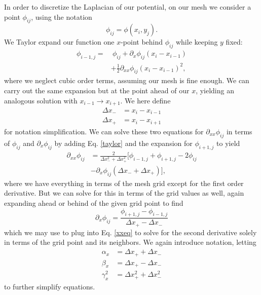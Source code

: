 \documentclass[reprint, amsmath, amssymb, aps, floatfix]{revtex4-1}
\begin{document}
In order to discretize the Laplacian of our potential, on our mesh we consider a point $\phi_{ij}$, using the notation $$\phi_{ij}=\phi(x_i,y_j).$$ We Taylor expand our function one $x$-point behind $\phi_{ij}$ while keeping $y$ fixed: \begin{equation}
\begin{aligned}
\phi_{i-1,j} =&\ \phi_{ij} + \partial_x \phi_{ij}(x_i-x_{i-1})\\&+\frac{1}{2}\partial_{xx}\phi_{ij}(x_i-x_{i-1})^2, \label{taylor}
\end{aligned}
\end{equation} where we neglect cubic order terms, assuming our mesh is fine enough. We can carry out the same expansion but at the point ahead of our $x$, yielding an analogous solution with $x_{i-1}\to x_{i+1}$. We here define \begin{equation}
\begin{aligned}
\Delta x_- &= x_i-x_{i-1}\\
\Delta x_+ &= x_i-x_{i+1} \label{deltaeq}
\end{aligned}
\end{equation} for notation simplification. We can solve these two equations for $\partial_{xx}\phi_{ij}$ in terms of $\phi_{ij}$ and $\partial_x\phi_{ij}$ by adding Eq. \eqref{taylor} and the expansion for $\phi_{i+1,j}$ to yield \begin{equation}
\begin{aligned}
\partial_{xx}\phi_{ij} &= \frac{2}{\Delta x_-^2+\Delta x_+^2}\biggl[\phi_{i-1,j}+\phi_{i+1,j}-2\phi_{ij}\\&-\partial_x\phi_{ij}(\Delta x_-+\Delta x_+)\biggr], \label{xxeq}
\end{aligned}
\end{equation} where we have everything in terms of the mesh grid except for the first order derivative. But we can solve for this in terms of the grid values as well, again expanding ahead or behind of the given grid point to find \begin{equation}
\partial_x\phi_{ij}=\frac{\phi_{i+1,j}-\phi_{i-1,j}}{\Delta x_+ - \Delta x_-} \label{ptlxeq}
\end{equation} which we may use to plug into Eq. \eqref{xxeq} to solve for the second derivative solely in terms of the grid point and its neighbors. We again introduce notation, letting \begin{equation}
\begin{aligned}
\alpha_x &= \Delta x_++\Delta x_-\\
\beta_x &= \Delta x_+-\Delta x_-\\
\gamma_x^2 &= \Delta x_+^2+\Delta x_-^2 \label{params}
\end{aligned}
\end{equation} to further simplify equations.
\end{document}
